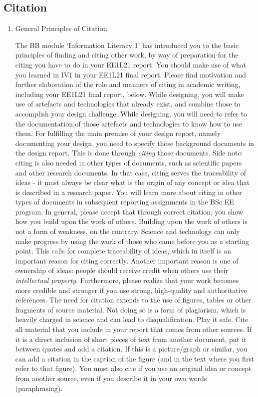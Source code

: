 \subsection{ Citation}

\begin{enumerate}


\item  General Principles of Citation

  The BB module `Information Literacy 1' has introduced you to the basic principles of finding and citing other work, by way of preparation for the citing you have to do in your EE1L21 report. You should make use of what you learned in IV1 in your EE1L21 final report. Please find motivation and further elaboration of the role and manners of citing in academic writing, including your EE1L21 final report, below. While designing, you will make use of artefacts and technologies that already exist, and combine those to accomplish your design challenge. While designing, you will need to refer to the documentation of those artefacts and technologies to know how to use them. For fulfilling the main premise of your design report, namely documenting your design, you need to specify those background documents in the design report. This is done through \textit{citing }those documents. Side note: citing is also needed in other types of documents, such as scientific papers and other research documents. In that case, citing serves the traceability of ideas - it must always be clear what is the origin of any concept or idea that is described in a research paper. You will learn more about citing in other types of documents in subsequent reporting assignments in the BSc EE program. In general, please accept that through correct citation, you show how you build upon the work of others. Building upon the work of others is not a form of weakness, on the contrary. Science and technology can only make progress by using the work of those who came before you as a starting point. This calls for complete traceability of ideas, which in itself is an important reason for citing correctly. Another important reason is one of ownership of ideas: people should receive credit when others use their \textit{intellectual property}. Furthermore, please realize that your work becomes more credible and stronger if you use strong, high-quality and authoritative references. The need for citation extends to the use of figures, tables or other fragments of source material. Not doing so is a form of plagiarism, which is heavily charged in science and can lead to disqualification. Play it safe. Cite all material that you include in your report that comes from other sources. If it is a direct inclusion of short pieces of text from another document, put it between quotes and add a citation. If this is a picture/graph or similar, you can add a citation in the caption of the figure (and in the text where you first refer to that figure). You must also cite if you use an original idea or concept from another source, even if you describe it in your own words (paraphrasing).



\end{enumerate}
